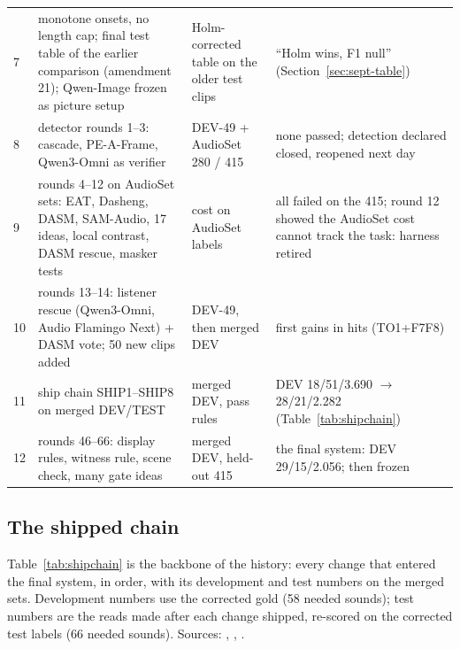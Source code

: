 \begin{longtable}{L{1.7cm}L{4.2cm}L{3.6cm}L{5.2cm}}
7 & monotone onsets, no length cap; final test table of the earlier comparison (amendment 21); Qwen-Image frozen as picture setup & Holm-corrected table on the older test clips & ``Holm wins, F1 null'' (Section~\ref{sec:sept-table}) \\
8 & detector rounds 1--3: cascade, PE-A-Frame, Qwen3-Omni as verifier & DEV-49 + AudioSet 280 / 415 & none passed; detection declared closed, reopened next day \\
9 & rounds 4--12 on AudioSet sets: EAT, Dasheng, DASM, SAM-Audio, 17 ideas, local contrast, DASM rescue, masker tests & cost on AudioSet labels & all failed on the 415; round 12 showed the AudioSet cost cannot track the task: harness retired \\
10 & rounds 13--14: listener rescue (Qwen3-Omni, Audio Flamingo Next) + DASM vote; 50 new clips added & DEV-49, then merged DEV & first gains in hits (TO1+F7F8) \\
11 & ship chain SHIP1--SHIP8 on merged DEV/TEST & merged DEV, pass rules & DEV 18/51/3.690 $\to$ 28/21/2.282 (Table~\ref{tab:shipchain}) \\
12 & rounds 46--66: display rules, witness rule, scene check, many gate ideas & merged DEV, held-out 415 & the final system: DEV 29/15/2.056; then frozen \\
\end{longtable}

\subsection{The shipped chain}\label{sec:shipchain}
Table~\ref{tab:shipchain} is the backbone of the history: every change that entered the final system, in order, with its
development and test numbers on the merged sets. Development numbers use the corrected gold (58 needed sounds);
test numbers are the reads made after each change shipped, re-scored on the corrected test labels (66 needed sounds). Sources: ,
, .


